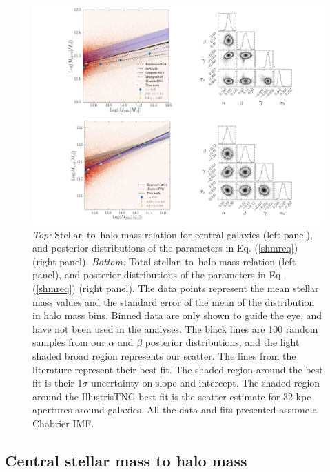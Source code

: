 {\begin{figure}\hspace{-2cm}
\includegraphics[width=1.3\textwidth]{./chapters/chapter6/figs/shmr_all_001.jpeg}
\caption{\emph{Top: }Stellar--to--halo mass relation for central galaxies (left panel), and posterior distributions of the parameters in Eq. (\ref{shmreq}) (right panel). \emph{Bottom: }Total stellar--to--halo mass relation (left panel), and posterior distributions of the parameters in Eq. (\ref{shmreq}) (right panel). The data points represent the mean stellar mass values and the standard error of the mean of the distribution in halo mass bins. Binned data are only shown to guide the eye, and have not been used in the analyses. The black lines are 100 random samples from our $\alpha$ and $\beta$ posterior distributions, and the light shaded broad region represents our scatter. The lines from the literature represent their best fit. The shaded region around the \citet{kravtsov} best fit is their 1$\sigma$ uncertainty on slope and intercept. The shaded region around the IllustrisTNG best fit is the \citet{illustris} scatter estimate for 32 kpc apertures around galaxies. All the data and fits presented assume a Chabrier IMF.}\label{shmrall}\end{figure}

\subsection{Central stellar mass to halo mass}

}
